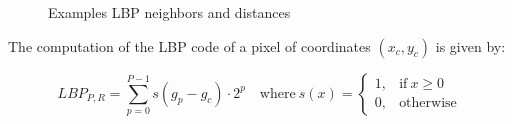 \begin{figure}[!htb]
  \centering
    \hspace{1mm}
    \hspace{1mm}
    \caption{Examples LBP neighbors and distances}
    \label{ch2:fig4}
\end{figure}

The computation of the \Gls{LBP} code of a pixel of coordinates $(x_c,y_c)$ is given by:

\begin{equation}
\label{ch2:eq_lbp1}
 LBP_{P,R} = \sum_{p=0}^{P-1} s(g_p - g_c) \cdot 2^{p} \quad \textrm{where} \ s(x) = 
    \left\{
	\begin{array}{ll} 1, & \textrm{if} \ x \geq 0\\
			  0, & \textrm{otherwise}
	\end{array}
    \right.
\end{equation}

